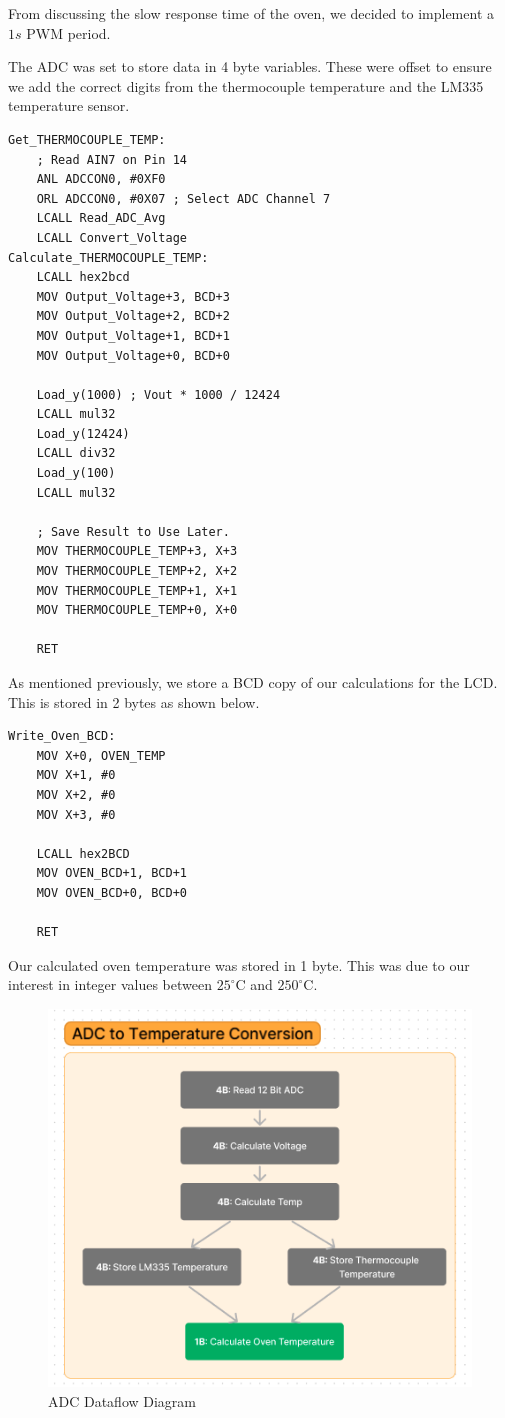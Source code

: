 \documentclass{article}
\begin{document}
\noindent From discussing the slow response time of the oven, we decided to implement a $1s$ PWM period.

The ADC was set to store data in 4 byte variables. These were offset to ensure we add the correct digits from the thermocouple temperature and the LM335 temperature sensor.

\begin{lstlisting}[language={[x86masm]Assembler}]
Get_THERMOCOUPLE_TEMP:
	; Read AIN7 on Pin 14
	ANL ADCCON0, #0XF0
	ORL ADCCON0, #0X07 ; Select ADC Channel 7
	LCALL Read_ADC_Avg
	LCALL Convert_Voltage
Calculate_THERMOCOUPLE_TEMP:
	LCALL hex2bcd
	MOV Output_Voltage+3, BCD+3
	MOV Output_Voltage+2, BCD+2
	MOV Output_Voltage+1, BCD+1
	MOV Output_Voltage+0, BCD+0

	Load_y(1000) ; Vout * 1000 / 12424
	LCALL mul32
	Load_y(12424)
	LCALL div32
	Load_y(100)
	LCALL mul32

	; Save Result to Use Later.
	MOV THERMOCOUPLE_TEMP+3, X+3
	MOV THERMOCOUPLE_TEMP+2, X+2
	MOV THERMOCOUPLE_TEMP+1, X+1
	MOV THERMOCOUPLE_TEMP+0, X+0

	RET
\end{lstlisting}

\noindent As mentioned previously, we store a BCD copy of our calculations for the LCD. This is stored in 2 bytes as shown below.

\begin{lstlisting}[language={[x86masm]Assembler}]
Write_Oven_BCD:
	MOV X+0, OVEN_TEMP
	MOV X+1, #0
	MOV X+2, #0
	MOV X+3, #0

	LCALL hex2BCD
	MOV OVEN_BCD+1, BCD+1
	MOV OVEN_BCD+0, BCD+0

	RET
\end{lstlisting}

Our calculated oven temperature was stored in 1 byte. This was due to our interest in integer values between $25^\circ\text{C}$ and $250^\circ\text{C}$.

\begin{figure}[H]
  \centering
  \includegraphics[width=0.8\linewidth]{Figures/ADC.png}
  \caption{ADC Dataflow Diagram}
  \label{fig:ADC}
\end{figure}
\end{document}
